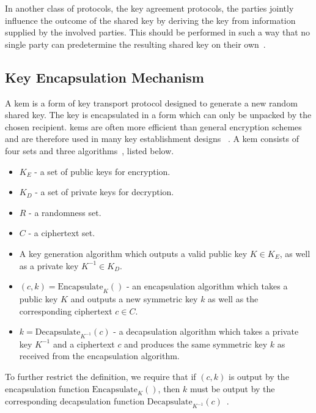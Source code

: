 In another class of protocols, the key agreement protocols, the parties jointly influence the outcome of the shared key by deriving the key from information supplied by the involved parties. This should be performed in such a way that no single party can predetermine the resulting shared key on their own~\cite{boyd2020}.

\subsection{Key Encapsulation Mechanism}

A \acrfull{kem} is a form of key transport protocol designed to generate a new random shared key. The key is encapsulated in a form which can only be unpacked by the chosen recipient. \glspl{kem} are often more efficient than general encryption schemes and are therefore used in many key establishment designs ~\cite{boyd2020}. A \gls{kem} consists of four sets and three algorithms~\cite{boyd2020}, listed below.

\begin{itemize}
    \item $K_E$ - a set of public keys for encryption.
    \item $K_D$ - a set of private keys for decryption.
    \item $R$ - a randomness set.
    \item $C$ - a ciphertext set.
\end{itemize}

\begin{itemize}
    \item A key generation algorithm which outputs a valid public key $K\in K_E$, as well as a private key $K^{-1}\in K_D$.
    \item $(c,k)=\text{Encapsulate}_K()$ - an encapsulation algorithm which takes a public key $K$ and outputs a new symmetric key $k$ as well as the corresponding ciphertext $c\in C$.
    \item $k=\text{Decapsulate}_{K^{-1}}(c)$ - a decapsulation algorithm which takes a private key $K^{-1}$ and a ciphertext $c$ and produces the same symmetric key $k$ as received from the encapsulation algorithm.
\end{itemize}

\noindent To further restrict the definition, we require that if $(c,k)$ is output by the encapsulation function $\text{Encapsulate}_K()$, then $k$ must be output by the corresponding decapsulation function $\text{Decapsulate}_{K^{-1}}(c)$~\cite{boyd2020}.

